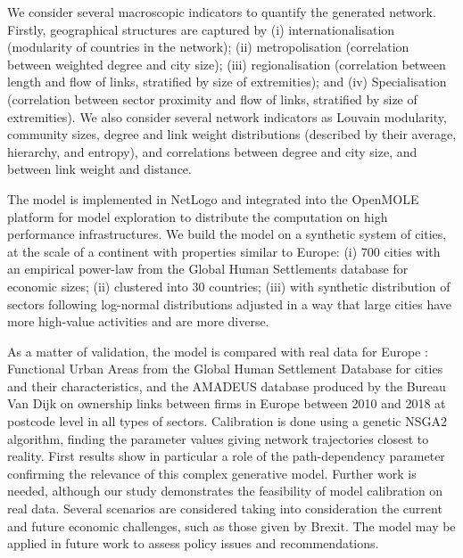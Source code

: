 \documentclass[10pt,letterpaper]{article}
\begin{document}
We consider several macroscopic indicators to quantify the generated network. Firstly, geographical structures are captured by (i) internationalisation (modularity of countries in the network); (ii) metropolisation (correlation between weighted degree and city size); (iii) regionalisation (correlation between length and flow of links, stratified by size of extremities); and (iv) Specialisation (correlation between sector proximity and flow of links, stratified by size of extremities). We also consider several network indicators as Louvain modularity, community sizes, degree and link weight distributions (described by their average, hierarchy, and entropy), and correlations between degree and city size, and between link weight and distance.

The model is implemented in NetLogo and integrated into the OpenMOLE platform for model exploration to distribute the computation on high performance infrastructures. We build the model on a synthetic system of cities, at the scale of a continent with properties similar to Europe: (i) 700 cities with an empirical power-law from the Global Human Settlements database for economic sizes; (ii) clustered into 30 countries; (iii) with synthetic distribution of sectors following log-normal distributions adjusted in a way that large cities have more high-value activities and are more diverse. 

As a matter of validation, the model is compared with real data for Europe : Functional Urban Areas from the Global Human Settlement Database for cities and their characteristics, and the AMADEUS database produced by the Bureau Van Dijk on ownership links between firms in Europe between 2010 and 2018 at postcode level in all types of sectors. Calibration is done using a genetic NSGA2 algorithm, finding the parameter values giving network trajectories closest to reality. First results show in particular a role of the path-dependency parameter confirming the relevance of this complex generative model. Further work is needed, although our study demonstrates the feasibility of model calibration on real data. Several scenarios are considered taking into consideration the current and future economic challenges, such as those given by Brexit. The model may be applied in future work to assess policy issues and recommendations.
\end{document}
